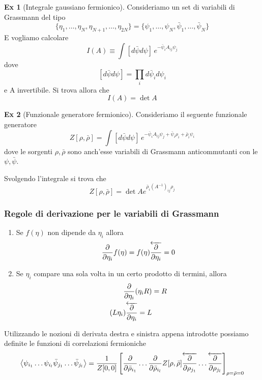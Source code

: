 \documentclass[10pt,a4paper]{article}
\theoremstyle{definition}
\newtheorem{example}{Ex}[section]
\begin{document}
\begin{example}[Integrale gaussiano fermionico]
    Consideriamo un set di variabili di Grassmann del tipo
    \[
    \{\eta_1, \dots, \eta_N, \eta_{N + 1}, \dots, \eta_{2N}\} = \{\psi_1, \dots, \psi_N, \bar{\psi}_1, \dots, \bar{\psi}_N\}    
    \]
    E vogliamo calcolare
    \[
    I(A) \equiv \int [d\bar{\psi}d\psi]\, e^{-\bar{\psi}_i A_{ij}\psi_j}     
    \]
    dove 
    \[
        [d\bar{\psi}d\psi] = \prod_i d\bar{\psi}_i d\psi_i   
    \]
    e A invertibile. Si trova allora che
    \[
    I(A) = \det A    
    \]
\end{example}

\begin{example}[Funzionale generatore fermionico]
    Consideriamo il seguente funzionale generatore 
    \[
    Z[\rho, \bar{\rho}] = \int [d\bar{\psi}d\psi] \, e^{-\bar{\psi}_i A_{ij}\psi_j + \bar{\psi}_i \rho_i + \bar{\rho}_i \psi_i}    
    \]
    dove le sorgenti $\rho, \bar{\rho}$ sono anch'esse variabili di Grassmann anticommutanti con le $\psi, \bar{\psi}$.

    Svolgendo l'integrale si trova che
    \[
    Z[\rho, \bar{\rho}] = \det A e^{\bar{\rho}_i (A^{-1})_{ij}\rho_j}    
    \]
\end{example}  

\subsubsection{Regole di derivazione per le variabili di Grassmann}
\begin{enumerate}
    \item Se $f(\eta)$ non dipende da $\eta_i$ allora 
    \[
    \pdv{\eta_i}f(\eta) = f(\eta)\overleftarrow{\pdv{\eta_i}}=0    
    \]
    \item Se $\eta_i$ compare una sola volta in un certo prodotto di termini, allora 
    \begin{align*}
        \pdv{\eta_i}(\eta_i R) &= R \\
        (L \eta_i)\overleftarrow{\pdv{\eta_i}} = L 
    \end{align*}
\end{enumerate}
Utilizzando le nozioni di derivata destra e sinistra appena introdotte possiamo definite le funzioni di correlazioni fermioniche
\[
\left< \psi_{i_1} \dots \psi_{i_l} \bar{\psi}_{j_1} \dots \bar{\psi}_{j_l} \right> = \frac{1}{Z[0, 0]}\left[\pdv{\bar{\rho}_{i_1}} \dots \pdv{\bar{\rho}_{i_l}} Z[\rho, \bar{\rho}] \overleftarrow{\pdv{\rho_{j_1}}} \dots \overleftarrow{\pdv{\rho_{j_l}}}\right]_{\rho = \bar{\rho} = 0}  
\]
\end{document}
